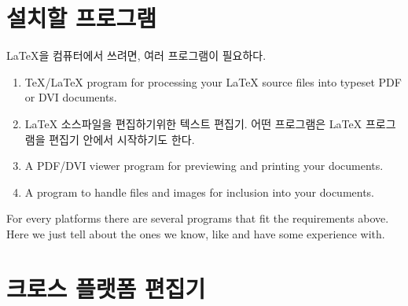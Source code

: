 \section{설치할 프로그램}
\LaTeX{}을 컴퓨터에서 쓰려면, 여러 프로그램이 필요하다.
\begin{enumerate}

\item \TeX{}/\LaTeX{} program for processing your \LaTeX{} source files
into typeset PDF or DVI documents.

\item \LaTeX{} 소스파일을 편집하기위한 텍스트 편집기.
어떤 프로그램은 \LaTeX{} 프로그램을 편집기 안에서 시작하기도 한다.

\item A PDF/DVI viewer program for previewing and printing your
documents.

\item A program to handle \PSi{} files and images for inclusion into
your documents.

\end{enumerate}

For every platforms there are several programs that fit the requirements above.
Here we just tell about the ones we know, like and have some experience
with.

\section{크로스 플랫폼 편집기}
\label{sec:texmaker}

